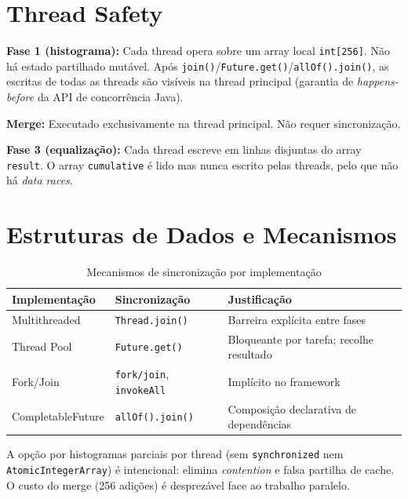 \documentclass[a4paper,11pt,openright,BCOR=15mm]{scrbook}
\begin{document}
\section{Thread Safety}

\textbf{Fase 1 (histograma):} Cada thread opera sobre um array local \texttt{int[256]}. Não há estado partilhado mutável. Após \texttt{join()}/\texttt{Future.get()}/\texttt{allOf().join()}, as escritas de todas as threads são visíveis na thread principal (garantia de \textit{happens-before} da API de concorrência Java).

\textbf{Merge:} Executado exclusivamente na thread principal. Não requer sincronização.

\textbf{Fase 3 (equalização):} Cada thread escreve em linhas disjuntas do array \texttt{result}. O array \texttt{cumulative} é lido mas nunca escrito pelas threads, pelo que não há \textit{data races}.

\section{Estruturas de Dados e Mecanismos}

\begin{table}[H]
    \centering
    \caption{Mecanismos de sincronização por implementação}
    \label{tab:sync}
    \begin{tabular}{lll}
        \toprule
        \textbf{Implementação} & \textbf{Sincronização} & \textbf{Justificação} \\
        \midrule
        Multithreaded  & \texttt{Thread.join()} & Barreira explícita entre fases \\
        Thread Pool    & \texttt{Future.get()}  & Bloqueante por tarefa; recolhe resultado \\
        Fork/Join      & \texttt{fork/join}, \texttt{invokeAll} & Implícito no framework \\
        CompletableFuture & \texttt{allOf().join()} & Composição declarativa de dependências \\
        \bottomrule
    \end{tabular}
\end{table}

A opção por histogramas parciais por thread (sem \texttt{synchronized} nem \texttt{AtomicIntegerArray}) é intencional: elimina \textit{contention} e falsa partilha de cache. O custo do merge (256 adições) é desprezável face ao trabalho paralelo.

\end{document}
